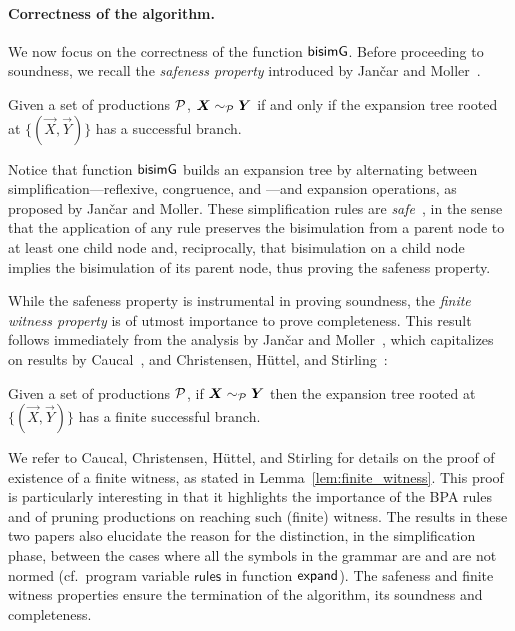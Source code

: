 \paragraph{Correctness of the algorithm.}

We now focus on the correctness of the function $\mathsf{bisimG}$.  Before
proceeding to soundness, we recall the \emph{safeness property}
introduced by Jan{\v{c}}ar and Moller~\cite{janvcar1999techniques}.

\begin{lemma} 
  \label{lem:safeness}
  Given a set of productions $\mathcal P$,
  $\vec X \ProdEquiv \vec Y$ if and only if the expansion tree rooted
  at $\{(\vec X, \vec Y)\}$ has a successful branch.
\end{lemma}

Notice that function $\mathsf{bisimG}$ builds an expansion tree by alternating
between simplification---reflexive, congruence, and \BPA---and
expansion operations, as proposed by Jan{\v{c}}ar and Moller.
%
These simplification rules are
\emph{safe}~\cite{janvcar1999techniques}, in the sense that the
application of any rule preserves the bisimulation from a parent node
to at least one child node and, reciprocally, that bisimulation on a
child node implies the bisimulation of its parent node, thus proving
the safeness property.

While the safeness property is instrumental in proving
soundness, the \emph{finite witness property} is of
utmost importance to prove completeness. This result follows
immediately from the analysis by Jan{\v{c}}ar and
Moller~\cite{janvcar1999techniques}, which capitalizes on results by
Caucal~\cite{caucal1986decidabilite}, and Christensen, H{\"{u}}ttel, and
Stirling~\cite{DBLP:journals/iandc/ChristensenHS95}:

\begin{lemma} 
\label{lem:finite_witness}
	Given a set of productions $\mathcal P$,
	if $\vec X \ProdEquiv \vec Y$ then the expansion tree rooted at
	$\{(\vec X, \vec Y)\}$ has a finite successful branch.
\end{lemma}

We refer to Caucal, Christensen, H{\"{u}}ttel, and Stirling for
details on the proof of existence of a finite witness, as stated in
Lemma~\ref{lem:finite_witness}. This proof is particularly interesting
in that it highlights the importance of the BPA rules and of pruning
productions on reaching such (finite) witness. The results in these
two papers also elucidate the reason for the distinction, in the
simplification phase, between the cases where all the symbols in the
grammar are and are not normed (cf.~program variable $\mathsf{rules}$
in function $\mathsf{expand}$).
%
The safeness and finite witness properties ensure the termination of
the algorithm, its soundness and completeness.


